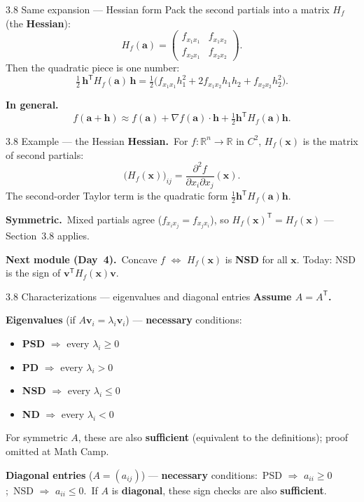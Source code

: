 \documentclass[11pt,aspectratio=169]{beamer}
\begin{document}
\begin{frame}{3.8 Same expansion --- Hessian form}
  \footnotesize
  Pack the second partials into a matrix $H_f$ (the \textbf{Hessian}):
  \[
    H_f(\mathbf{a})
    =
    \begin{pmatrix} f_{x_1x_1} & f_{x_1x_2} \\ f_{x_2x_1} & f_{x_2x_2} \end{pmatrix}.
  \]
  Then the quadratic piece is one number:
  \[
    \tfrac12\,\mathbf{h}^{\mathsf T}H_f(\mathbf{a})\,\mathbf{h}
    =\tfrac12\bigl(
      f_{x_1x_1}h_1^2 + 2f_{x_1x_2}h_1 h_2 + f_{x_2x_2}h_2^2
    \bigr).
  \]

  \medskip
  \textbf{In general.}
  \[
    f(\mathbf{a}+\mathbf{h})
    \approx f(\mathbf{a})+\nabla f(\mathbf{a})\cdot\mathbf{h}+\tfrac12\mathbf{h}^{\mathsf T}H_f(\mathbf{a})\mathbf{h}.
  \]
\end{frame}

\begin{frame}{3.8 Example --- the Hessian}
  \footnotesize
  \textbf{Hessian.}\
  For $f:\mathbb{R}^n\to\mathbb{R}$ in $C^2$, $H_f(\mathbf{x})$ is the matrix of second partials:
  \[
    \bigl(H_f(\mathbf{x})\bigr)_{ij}=\frac{\partial^2 f}{\partial x_i\partial x_j}(\mathbf{x}).
  \]
  The second-order Taylor term is the quadratic form $\tfrac12\mathbf{h}^{\mathsf T}H_f(\mathbf{a})\mathbf{h}$.

  \medskip
  \textbf{Symmetric.}\
  Mixed partials agree ($f_{x_ix_j}=f_{x_jx_i}$), so $H_f(\mathbf{x})^{\mathsf T}=H_f(\mathbf{x})$ --- Section~3.8 applies.

  \medskip
  \textbf{Next module (Day~4).}\
  Concave $f$ $\Leftrightarrow$ $H_f(\mathbf{x})$ is \textbf{NSD} for all $\mathbf{x}$.
  Today: NSD is the sign of $\mathbf{v}^{\mathsf T}H_f(\mathbf{x})\mathbf{v}$.
\end{frame}

\begin{frame}{3.8 Characterizations --- eigenvalues and diagonal entries}
  \footnotesize
  \textbf{Assume $A=A^{\mathsf T}$.}

  \medskip
  \textbf{Eigenvalues} (if $A\mathbf{v}_i=\lambda_i\mathbf{v}_i$) --- \textbf{necessary} conditions:
  \begin{itemize}
    \item \textbf{PSD} $\Rightarrow$ every $\lambda_i\ge 0$
    \item \textbf{PD} $\Rightarrow$ every $\lambda_i>0$
    \item \textbf{NSD} $\Rightarrow$ every $\lambda_i\le 0$
    \item \textbf{ND} $\Rightarrow$ every $\lambda_i<0$
  \end{itemize}
  {\scriptsize For symmetric $A$, these are also \textbf{sufficient} (equivalent to the definitions); proof omitted at Math Camp.}

  \medskip
  \textbf{Diagonal entries} ($A=(a_{ij})$) --- \textbf{necessary} conditions:\
  PSD $\Rightarrow$ $a_{ii}\ge 0$;\ NSD $\Rightarrow$ $a_{ii}\le 0$.\
  If $A$ is \textbf{diagonal}, these sign checks are also \textbf{sufficient}.
\end{frame}
\end{document}
